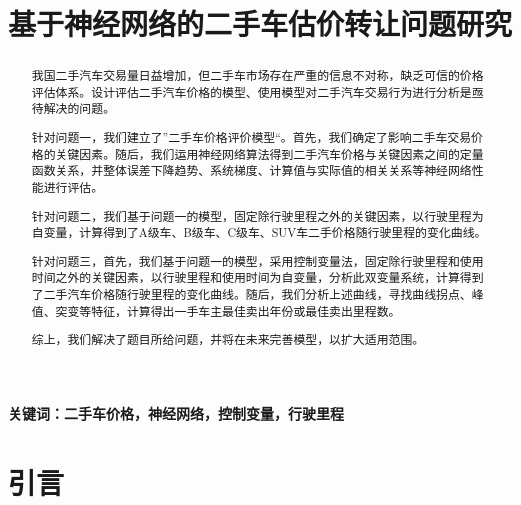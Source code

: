 \documentclass{ctexart}
\begin{document}

\title{\textbf{基于神经网络的二手车估价转让问题研究}}
\author{}
\date{}
\maketitle

\renewcommand{\abstractname}{\Large 摘要}
\begin{abstract}

	我国二手汽车交易量日益增加，但二手车市场存在严重的信息不对称，缺乏可信的价格评估体系。设计评估二手汽车价格的模型、使用模型对二手汽车交易行为进行分析是亟待解决的问题。

	针对问题一，我们建立了”二手车价格评价模型“。首先，我们确定了影响二手车交易价格的关键因素。随后，我们运用神经网络算法得到二手汽车价格与关键因素之间的定量函数关系，并整体误差下降趋势、系统梯度、计算值与实际值的相关关系等神经网络性能进行评估。

	针对问题二，我们基于问题一的模型，固定除行驶里程之外的关键因素，以行驶里程为自变量，计算得到了A级车、B级车、C级车、SUV车二手价格随行驶里程的变化曲线。

	针对问题三，首先，我们基于问题一的模型，采用控制变量法，固定除行驶里程和使用时间之外的关键因素，以行驶里程和使用时间为自变量，分析此双变量系统，计算得到了二手汽车价格随行驶里程的变化曲线。随后，我们分析上述曲线，寻找曲线拐点、峰值、突变等特征，计算得出一手车主最佳卖出年份或最佳卖出里程数。

	综上，我们解决了题目所给问题，并将在未来完善模型，以扩大适用范围。
\end{abstract}

\textbf{关键词：二手车价格，神经网络，控制变量，行驶里程}

\newpage



\tableofcontents

\newpage

\listoffigures

\newpage

\listoftables

\newpage

\setcounter{section}{-1}


\section{引言}%
\label{sec:引言}
\end{document}
